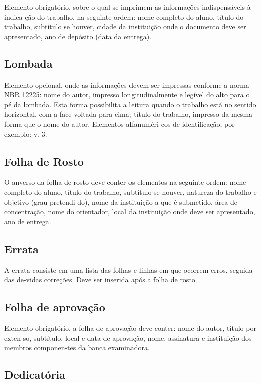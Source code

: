 Elemento obrigatório, sobre o qual se imprimem as informações
indispensáveis à indica-ção do trabalho, na seguinte ordem: nome completo do aluno, título do trabalho, subtítulo se houver, cidade da instituição onde o documento deve ser apresentado, ano de depósito (data da entrega).

\subsection{Lombada}

Elemento opcional, onde as informações devem ser impressas
conforme a norma NBR 12225: nome do autor, impresso longitudinalmente e legível do alto para o pé da lombada. Esta forma possibilita a leitura quando o trabalho está no sentido horizontal, com a face voltada para cima; título do trabalho, impresso da mesma forma que o nome do autor. Elementos alfanuméri-cos de identificação, por exemplo: v. 3.

\subsection{Folha de Rosto}

O anverso da folha de rosto deve conter os elementos na seguinte
ordem: nome completo do aluno, título do trabalho, subtítulo se houver, natureza do trabalho e objetivo (grau pretendi-do), nome da instituição a que é submetido, área de concentração, nome do orientador, local da instituição onde deve ser apresentado, ano de entrega.

\subsection{Errata}

A errata consiste em uma lista das folhas e linhas em que ocorrem
erros, seguida das de-vidas correções. Deve ser inserida após a folha de rosto.

\subsection{Folha de aprovação}

Elemento obrigatório, a folha de aprovação deve conter: nome do
autor, título por exten-so, subtítulo, local e data de aprovação, nome, assinatura e instituição dos membros componen-tes da banca examinadora.

\subsection{Dedicatória}

